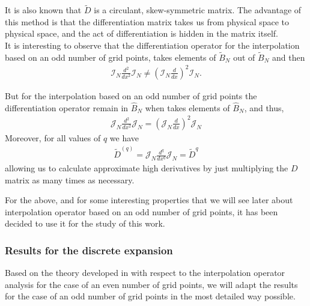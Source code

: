     It is also known that $\widetilde{D}$ is a circulant, skew-symmetric matrix. The advantage of this method is that the differentiation matrix takes us from physical space to physical space, and the act of differentiation is hidden in the matrix itself. \\
    
    It is interesting to observe that the differentiation operator for the interpolation based on an odd number of grid points, takes elements of $\widetilde{B}_N$ out of $\widetilde{B}_N$ and then
    \begin{align*}
    	\mathcal{I}_N \frac{d^2}{dx^2} \mathcal{I}_N \neq \left( \mathcal{I}_N \frac{d}{dx} \right)^2 \mathcal{I}_N.
    \end{align*}
	
	But for the interpolation based on an odd number of grid points the differentiation operator remain in $\hat{B}_N$ when takes elements of $\hat{B}_N$, and thus,
	\begin{align*}
		\mathcal{J}_N \frac{d^2}{dx^2} \mathcal{J}_N = \left( \mathcal{J}_N \frac{d}{dx} \right)^2 \mathcal{J}_N
	\end{align*}
    Moreover, for all values of $q$ we have
    \begin{align*}
        \widetilde{D}^{(q)} = \mathcal{J}_N \frac{d^q}{dx^q} \mathcal{J}_N = \widetilde{D}^q
    \end{align*}
	allowing us to calculate approximate high derivatives by just multiplying the $D$ matrix as many times as necessary.
    
    For the above, and for some interesting properties that we will see later about interpolation operator based on an odd number of grid points, it has been decided to use it for the study of this work.
    
    \subsubsection{Results for the discrete expansion}
    
    Based on the theory developed in \cite{gottlieb2007} with respect to the interpolation operator analysis for the case of an even number of grid points, we will adapt the results for the case of an odd number of grid points in the most detailed way possible. \\
    
